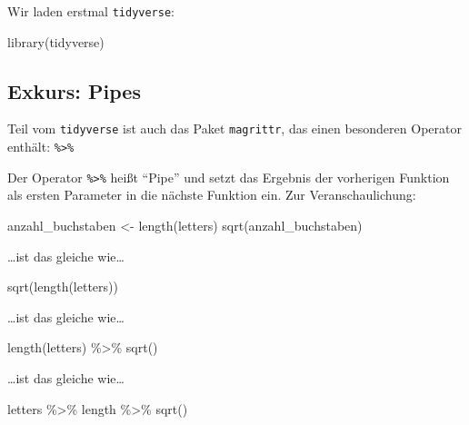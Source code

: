 \documentclass[
  ngerman,
]{article}
\newenvironment{Shaded}{\begin{snugshade}}{\end{snugshade}}
\newcommand{\FunctionTok}[1]{\textcolor[rgb]{0.00,0.00,0.00}{#1}}
\newcommand{\NormalTok}[1]{#1}
\newcommand{\OtherTok}[1]{\textcolor[rgb]{0.56,0.35,0.01}{#1}}
\newcommand{\SpecialCharTok}[1]{\textcolor[rgb]{0.00,0.00,0.00}{#1}}
\begin{document}
Wir laden erstmal \texttt{tidyverse}:

\begin{Shaded}
\begin{Highlighting}[]
\FunctionTok{library}\NormalTok{(tidyverse)}
\end{Highlighting}
\end{Shaded}

\hypertarget{exkurs-pipes}{%
\subsection{Exkurs: Pipes}\label{exkurs-pipes}}

Teil vom \texttt{tidyverse} ist auch das Paket \texttt{magrittr}, das einen besonderen Operator enthält: \texttt{\%\textgreater{}\%}

Der Operator \texttt{\%\textgreater{}\%} heißt ``Pipe'' und setzt das Ergebnis der vorherigen Funktion als ersten Parameter in die nächste Funktion ein. Zur Veranschaulichung:

\begin{Shaded}
\begin{Highlighting}[]
\NormalTok{anzahl\_buchstaben }\OtherTok{\textless{}{-}} \FunctionTok{length}\NormalTok{(letters)}
\FunctionTok{sqrt}\NormalTok{(anzahl\_buchstaben)}
\end{Highlighting}
\end{Shaded}

\ldots ist das gleiche wie\ldots{}

\begin{Shaded}
\begin{Highlighting}[]
\FunctionTok{sqrt}\NormalTok{(}\FunctionTok{length}\NormalTok{(letters))}
\end{Highlighting}
\end{Shaded}

\ldots ist das gleiche wie\ldots{}

\begin{Shaded}
\begin{Highlighting}[]
\FunctionTok{length}\NormalTok{(letters) }\SpecialCharTok{\%\textgreater{}\%}
  \FunctionTok{sqrt}\NormalTok{()}
\end{Highlighting}
\end{Shaded}

\ldots ist das gleiche wie\ldots{}

\begin{Shaded}
\begin{Highlighting}[]
\NormalTok{letters }\SpecialCharTok{\%\textgreater{}\%}
\NormalTok{  length }\SpecialCharTok{\%\textgreater{}\%}
  \FunctionTok{sqrt}\NormalTok{()}
\end{Highlighting}
\end{Shaded}
\end{document}
